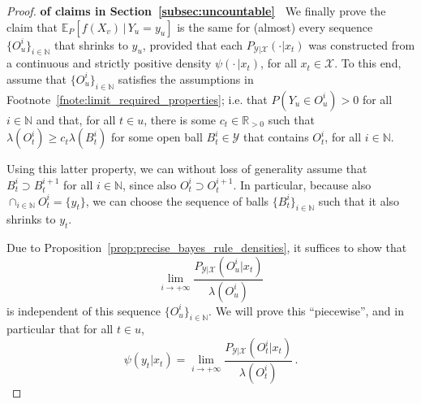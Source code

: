 \documentclass[twoside,11pt]{article}
\newcommand{\nats}{\mathbb{N}}
\newcommand{\reals}{\mathbb{R}}
\newcommand{\realspos}{\reals_{>0}}
\newcommand{\states}{\mathcal{X}}
\newcommand{\observs}{\mathcal{Y}}
\begin{document}
\begin{proof}{\bf of claims in Section~\ref{subsec:uncountable}~}
We finally prove the claim that $\mathbb{E}_P[f(X_v)\,\vert\,Y_u=y_u]$ is the same for (almost) every sequence $\{O_u^i\}_{i\in\nats}$ that shrinks to $y_u$, provided that each $P_{\observs\vert\states}(\cdot\vert x_t)$ was constructed from a continuous and strictly positive density $\psi(\cdot\,\vert x_t)$, for all $x_t\in\states$. To this end, assume that $\{O_u^i\}_{i\in\nats}$ satisfies the assumptions in Footnote~\ref{fnote:limit_required_properties}; i.e. that $P(Y_u\in O_u^i)>0$ for all $i\in\nats$ and that, for all $t\in u$, there is some $c_t\in\realspos$ such that $\lambda(O_t^i)\geq c_t\lambda(B_t^i)$ for some open ball $B_t^i\in\observs$ that contains $O_t^i$, for all $i\in\nats$.

Using this latter property, we can without loss of generality assume that $B_t^i\supset B_t^{i+1}$ for all $i\in\nats$, since also $O_t^i\supset O_t^{i+1}$. In particular, because also $\cap_{i\in\nats}O_t^i=\{y_t\}$, we can choose the sequence of balls $\{B_t^i\}_{i\in\nats}$ such that it also shrinks to $y_t$. 

Due to Proposition~\ref{prop:precise_bayes_rule_densities}, it suffices to show that
\begin{equation*}
\lim_{i\to+\infty} \frac{P_{\observs\vert\states}(O_u^i\vert x_t)}{\lambda(O_u^i)}
\end{equation*}
is independent of this sequence $\{O_u^i\}_{i\in\nats}$. We will prove this ``piecewise'', and in particular that for all $t\in u$,
\begin{equation*}
\psi(y_t\vert x_t) = \lim_{i\to+\infty} \frac{P_{\observs\vert\states}(O_t^i\vert x_t)}{\lambda(O_t^i)}\,.
\end{equation*}


\end{proof}
\end{document}
